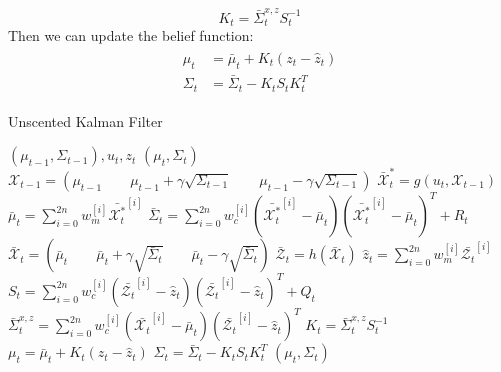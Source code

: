 \documentclass[twoside]{article}
\begin{document}
\begin{equation}
K_t = \bar{\Sigma}_t^{x,z}S_t^{-1}
\end{equation}
Then we can update the belief function:
\begin{align}
\begin{split}
\mu_t &= \bar{\mu}_t + K_t(z_t - \hat{z}_t) \\
\Sigma_t &= \bar{\Sigma}_t  - K_t S_t K_t^T
\end{split}
\end{align}

\begin{algorithm}[H]
\caption{Unscented Kalman Filter}
\begin{algorithmic}[1]
    $(\mu_{t-1}, \Sigma_{t-1}), u_t, z_t$
    $\left(\mu_t, \Sigma_t\right)$
    \State $ \mathcal{X}_{t-1} = \left(\mu_{t-1} \qquad \mu_{t-1} + \gamma \sqrt{\Sigma_{t-1}}\qquad \mu_{t-1} - \gamma \sqrt{\Sigma_{t-1}}\right)$ \;
    \State $\bar{\mathcal{X}}^*_t = g(u_t, \mathcal{X}_{t-1})$ \;
    \State $\bar{\mu}_t = \sum_{i=0}^{2n} w_m^{[i]}\bar{\mathcal{X}_t^*}^{[i]}$ \;
    \State $\bar{\Sigma}_t = \sum_{i=0}^{2n} w_c^{[i]}\left(\bar{\mathcal{X}_t^*}^{[i]} -\bar{\mu}_t\right)\left(\bar{\mathcal{X}_t^*}^{[i]} -\bar{\mu}_t\right)^T + R_t$ \;
    \State $ \bar{\mathcal{X}}_{t} = \left(\bar{\mu}_{t} \qquad \bar{\mu}_{t}  + \gamma \sqrt{\bar{\Sigma}_t}\qquad \bar{\mu}_{t}  - \gamma \sqrt{\bar{\Sigma}_t}\right)$ \;
    \State $\bar{\mathcal{Z}}_t = h(\bar{\mathcal{X}}_t)$\;
    \State $\hat{z}_t =  \sum_{i=0}^{2n} w_m^{[i]}\bar{\mathcal{Z}_t}^{[i]}$ \;
    \State $S_t = \sum_{i=0}^{2n} w_c^{[i]}\left(\bar{\mathcal{Z}_t}^{[i]} -\hat{z}_t\right)\left(\bar{\mathcal{Z}_t}^{[i]} -\hat{z}_t\right)^T + Q_t$ \;
    \State $\bar{\Sigma}_t^{x,z} = \sum_{i=0}^{2n} w_c^{[i]}\left(\bar{\mathcal{X}_t}^{[i]} -\bar{\mu}_t\right)\left(\bar{\mathcal{Z}_t}^{[i]} -\hat{z}_t\right)^T$ \;
    \State $K_t = \bar{\Sigma}_t^{x,z}S_t^{-1}$ \;
    \State $ \mu_t = \bar{\mu}_t + K_t(z_t - \hat{z}_t)$ \;
    \State $\Sigma_t = \bar{\Sigma}_t  - K_t S_t K_t^T$ \;
    $(\mu_t, \Sigma_t)$
\end{algorithmic}
\label{UKF_ALG}
\end{algorithm}
\end{document}
